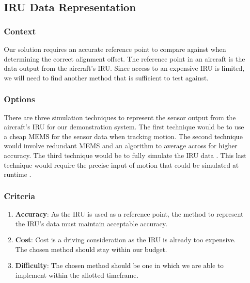 \subsection{IRU Data Representation}
\subsubsection{Context}
Our solution requires an accurate reference point to compare against when determining the correct alignment offset.
The reference point in an aircraft is the data output from the aircraft’s IRU.
Since access to an expensive IRU is limited, we will need to find another method that is sufficient to test against. \\

\subsubsection{Options}
There are three simulation techniques to represent the sensor output from the aircraft’s IRU for our demonstration system.
The first technique would be to use a cheap MEMS for the sensor data when tracking motion.
The second technique would involve redundant MEMS and an algorithm to average across for higher accuracy. The third technique would be to fully simulate the IRU data \cite{REDUNDANT}.
This last technique would require the precise input of motion that could be simulated at runtime \cite{NIST}. \\


\subsubsection{Criteria}
\begin{enumerate}
	\item \textbf{Accuracy}: As the IRU is used as a reference point, the method to represent the IRU's data must maintain acceptable accuracy.
	\item \textbf{Cost}: Cost is a driving consideration as the IRU is already too expensive. The chosen method should stay within our budget.
	\item \textbf{Difficulty}: The chosen method should be one in which we are able to implement within the allotted timeframe. \\
\end{enumerate}

\newpage
